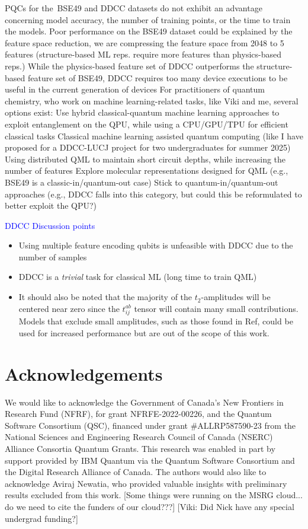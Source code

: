 \documentclass[journal=jacsat,manuscript=article]{achemso}
\begin{document}
PQCs for the BSE49 and DDCC datasets do not exhibit an advantage concerning model accuracy, the number of training points, or the time to train the models.
Poor performance on the BSE49 dataset could be explained by the feature space reduction, we are compressing the feature space from 2048 to 5 features (structure-based ML reps. require more features than physics-based reps.)
While the physics-based feature set of DDCC outperforms the structure-based feature set of BSE49, DDCC requires too many device executions to be useful in the current generation of devices
For practitioners of quantum chemistry, who work on machine learning-related tasks, like Viki and me, several options exist:
Use hybrid classical-quantum machine learning approaches to exploit entanglement on the QPU, while using a CPU/GPU/TPU for efficient classical tasks
Classical machine learning assisted quantum computing (like I have proposed for a DDCC-LUCJ project for two undergraduates for summer 2025)
Using distributed QML to maintain short circuit depths, while increasing the number of features
Explore molecular representations designed for QML (e.g., BSE49 is a classic-in/quantum-out case)
Stick to quantum-in/quantum-out approaches (e.g., DDCC falls into this category, but could this be reformulated to better exploit the QPU?)

\textcolor{blue}{DDCC Discussion points}
\begin{itemize}
	\item Using multiple feature encoding qubits\cite{suzuki_predicting_2020} is unfeasible with DDCC due to the number of samples
	\item DDCC is a \textit{trivial} task for classical ML (long time to train QML)
	\item It should also be noted that the majority of the $t_{2}$-amplitudes will be centered near zero since the $t^{ab}_{ij}$ tensor will contain many small contributions. Models that exclude small amplitudes, such as those found in Ref\cite{pathirage_exploration_2024}, could be used for increased performance but are out of the scope of this work.
\end{itemize}

\section{Acknowledgements}
We would like to acknowledge the Government of Canada’s New Frontiers in Research Fund (NFRF), for grant NFRFE-2022-00226, and the Quantum Software Consortium (QSC), financed under grant \#ALLRP587590-23 from the National Sciences and Engineering Research Council of Canada (NSERC) Alliance Consortia Quantum Grants.
This research was enabled in part by support provided by IBM Quantum via the Quantum Software Consortium and the Digital Research Alliance of Canada.
The authors would also like to acknowledge Aviraj Newatia, who provided valuable insights with preliminary results excluded from this work.
[Some things were running on the MSRG cloud... do we need to cite the funders of our cloud???]
[Viki: Did Nick have any special undergrad funding?]


\end{document}
